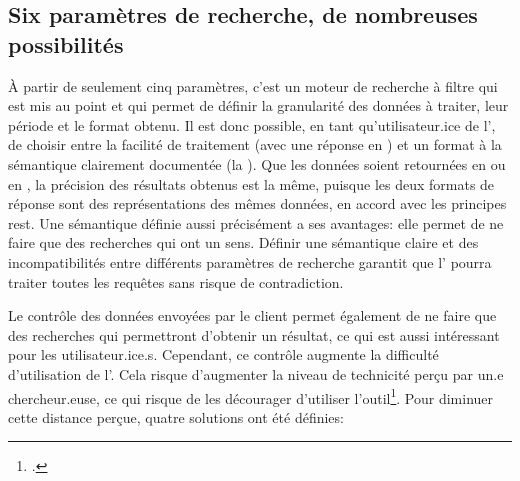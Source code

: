 \subsection{Six paramètres de recherche, de nombreuses possibilités}
À partir de seulement cinq paramètres, c'est un moteur de recherche à filtre qui est mis au point et qui permet de définir la granularité des données à traiter, leur période et le format obtenu. Il est donc possible, en tant qu'utilisateur.ice de l'\api{}, de choisir entre la facilité de traitement (avec une réponse en \json{}) et un format à la sémantique clairement documentée (la \tei{}). Que les données soient retournées en \tei{} ou en \json{}, la précision des résultats obtenus est la même, puisque les deux formats de réponse sont des représentations des mêmes données, en accord avec les principes \gls{rest}. Une sémantique définie aussi précisément a ses avantages: elle permet de ne faire que des recherches qui ont un sens. Définir une sémantique claire et des incompatibilités entre différents paramètres de recherche garantit que l'\api{} pourra traiter toutes les requêtes sans risque de contradiction.

Le contrôle des données envoyées par le client permet également de ne faire que des recherches qui permettront d'obtenir un résultat, ce qui est aussi intéressant pour les utilisateur.ice.s. Cependant, ce contrôle augmente la difficulté d'utilisation de l'\api{}. Cela risque d'augmenter la niveau de technicité perçu par un.e chercheur.euse, ce qui risque de les décourager d'utiliser l'outil\footcite[p. 292-294]{edmond_apis_2015}. Pour diminuer cette distance perçue, quatre solutions ont été définies:

